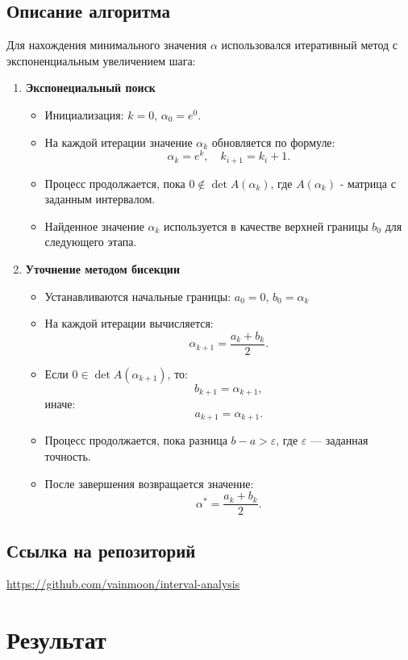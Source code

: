 \documentclass[a4paper,14pt]{article}
\begin{document}
	\subsection{Описание алгоритма}
	Для нахождения минимального значения \(\alpha\) использовался итеративный метод с экспоненциальным увеличением шага:
	\begin{enumerate}
		\item \textbf{Экспонециальный поиск}
		\begin{itemize}
			\item Инициализация: \( k = 0 \), \(\alpha_0 = e^0\).
			\item На каждой итерации значение \( \alpha_k \) обновляется по формуле:
          		\[ \alpha_k = e^k, \quad k_{i+1} = k_{i} + 1. \]
				  \item Процесс продолжается, пока \( 0 \notin \det A(\alpha_k) \), где \( A(\alpha_k) \) - матрица с заданным интервалом.
				  \item Найденное значение \( \alpha_k \) используется в качестве верхней границы \( b_0 \) для следующего этапа.
		\end{itemize}
		\item \textbf{Уточнение методом бисекции}
		\begin{itemize}
			\item Устанавливаются начальные границы: \( a_0 = 0 \), \( b_0 = \alpha_k \)
			\item На каждой итерации вычисляется:
				\[ \alpha_{k+1} = \frac{a_k + b_k}{2}. \]
			\item Если \( 0 \in \det A(\alpha_{k+1}) \), то:
				\[ b_{k+1} = \alpha_{k+1}, \]
			иначе:
				\[ a_{k+1} = \alpha_{k+1}. \]
			\item Процесс продолжается, пока разница \( b - a > \varepsilon \), где \( \varepsilon \) — заданная точность.
			\item После завершения возвращается значение:
				  \[ \alpha^* = \frac{a_k + b_k}{2}. \]	
		\end{itemize}
	\end{enumerate}
	
	\subsection{Ссылка на репозиторий}
	\url{https://github.com/vainmoon/interval-analysis} 
	
	\clearpage

	\section{Результат}
\end{document}
